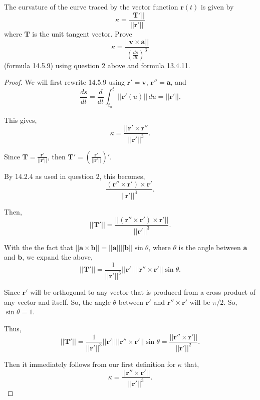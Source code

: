 \documentclass[../hw10]{subfiles}
\begin{document}
The curvature of the curve traced by the vector function $\mathbf{r}(t)$ is given by
\[\kappa=\frac{||\mathbf{T}'||}{||\mathbf{r}'||}\]
where $\mathbf{T}$ is the unit tangent vector. Prove 
\[\kappa=\frac{||\mathbf{v}\times \mathbf{a}||}{{\left(\frac{ds}{dt}\right)}^3}\]
(formula 14.5.9) using question 2 above and formula 13.4.11.

\begin{proof}
    We will first rewrite 14.5.9 using $\mathbf{r}'=\mathbf{v}$, $\mathbf{r}''=\mathbf{a}$, and
    \[\frac{ds}{dt}=\frac{d}{dt}\int_{t_0}^{t}||\mathbf{r}'(u)||\,du=||\mathbf{r}'||.\]

    This gives, \[\kappa=\frac{||\mathbf{r}'\times\mathbf{r}''}{{||\mathbf{r}'||}^3}.\]

    Since $\mathbf{T}=\frac{\mathbf{r}'}{||\mathbf{r}'||}$, then $\mathbf{T}'=\left( \frac{\mathbf{r}'}{||\mathbf{r}'||} \right)'$.

    By 14.2.4 as used in question 2, this becomes, \[\frac{\left( \mathbf{r}''\times\mathbf{r}' \right)\times\mathbf{r}'}{{||\mathbf{r}'||}^3}.\]

    Then, \[||\mathbf{T}'||=\frac{||\left( \mathbf{r}''\times\mathbf{r}' \right)\times\mathbf{r}'||}{{||\mathbf{r}'||}^3}.\]

    With the the fact that $||\mathbf{a}\times \mathbf{b}||=||\mathbf{a}|| ||\mathbf{b}|| \sin{\theta}$, where $\theta$ is the angle between $\mathbf{a}$ and $\mathbf{b}$, we expand the above,
    \[||\mathbf{T}'||=\frac{1}{{||\mathbf{r}'||}^3}||\mathbf{r}'|| ||\mathbf{r}''\times\mathbf{r}'||\sin{\theta}.\]

    Since $\mathbf{r}'$ will be orthogonal to any vector that is produced from a cross product of any vector and itself. So, the angle $\theta$ between $\mathbf{r}'$ and $\mathbf{r}''\times\mathbf{r}'$ will be $\pi/2$. So, $\sin{\theta}=1$.

    Thus, \[||\mathbf{T}'||=\frac{1}{{||\mathbf{r}'||}^3}||\mathbf{r}'|| ||\mathbf{r}''\times\mathbf{r}'||\sin{\theta}=\frac{||\mathbf{r}''\times\mathbf{r}'||}{{||\mathbf{r}'||}^2}.\]

    Then it immediately follows from our first definition for $\kappa$ that,
    \[\kappa=\frac{||\mathbf{r}''\times\mathbf{r}'||}{{||\mathbf{r}'||}^3}.\]
\end{proof}
\end{document}

